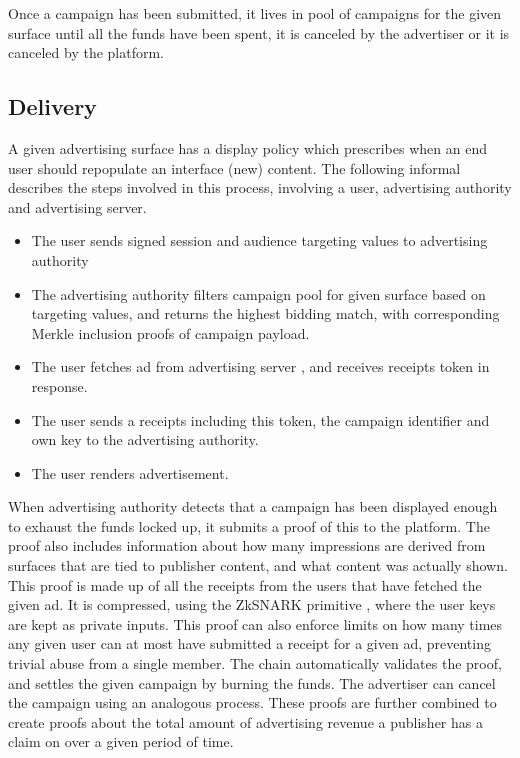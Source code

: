 \documentclass{article}
\begin{document}
Once a campaign has been submitted, it lives in pool of campaigns for the given surface until all the funds have been spent, it is canceled by the advertiser or it is canceled by the platform.

\subsection{Delivery}

A given advertising surface has a display policy which prescribes when an end user should repopulate an interface (new) content. The following informal describes the steps involved in this process, involving a user, advertising authority and advertising server.

\begin{itemize}
 \item The user sends signed session and audience targeting values to advertising authority
 \item The advertising authority filters campaign pool for given surface based on targeting values, and returns the highest bidding match, with corresponding Merkle inclusion proofs of campaign payload.
 \item The user fetches ad from advertising server , and receives receipts token in response.
 \item The user sends a receipts including this token, the campaign identifier and own key to the advertising authority.
 \item The user renders advertisement.
\end{itemize}

When advertising authority detects that a campaign has been displayed enough to exhaust the funds locked up, it submits a proof of this to the platform. The proof also includes information about how many impressions are derived from surfaces that are tied to publisher content, and what content was actually shown. This proof is made up of all the receipts from the users that have fetched the given ad. It is compressed, using the ZkSNARK primitive \cite{ben2014succinct}, where the user keys are kept as private inputs. This proof can also enforce limits on how many times any given user can at most have submitted a receipt for a given ad, preventing trivial abuse from a single member. The chain automatically validates the proof, and settles the given campaign by burning the funds. The advertiser can cancel the campaign using an analogous process. These proofs are further combined to create proofs about the total amount of advertising revenue a publisher has a claim on over a given period of time.
\end{document}
